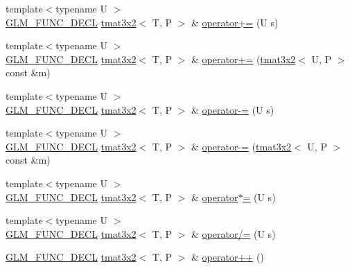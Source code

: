 \begin{DoxyCompactItemize}
\item 
{\footnotesize template$<$typename U $>$ }\\\hyperlink{setup_8hpp_ab2d052de21a70539923e9bcbf6e83a51}{G\+L\+M\+\_\+\+F\+U\+N\+C\+\_\+\+D\+E\+CL} \hyperlink{structglm_1_1detail_1_1tmat3x2}{tmat3x2}$<$ T, P $>$ \& \hyperlink{structglm_1_1detail_1_1tmat3x2_a41d01c7fbc6061206a33b265ddb9649b}{operator+=} (U s)
\item 
{\footnotesize template$<$typename U $>$ }\\\hyperlink{setup_8hpp_ab2d052de21a70539923e9bcbf6e83a51}{G\+L\+M\+\_\+\+F\+U\+N\+C\+\_\+\+D\+E\+CL} \hyperlink{structglm_1_1detail_1_1tmat3x2}{tmat3x2}$<$ T, P $>$ \& \hyperlink{structglm_1_1detail_1_1tmat3x2_a0ce859a11cdafb33342c159b4a4f145a}{operator+=} (\hyperlink{structglm_1_1detail_1_1tmat3x2}{tmat3x2}$<$ U, P $>$ const \&m)
\item 
{\footnotesize template$<$typename U $>$ }\\\hyperlink{setup_8hpp_ab2d052de21a70539923e9bcbf6e83a51}{G\+L\+M\+\_\+\+F\+U\+N\+C\+\_\+\+D\+E\+CL} \hyperlink{structglm_1_1detail_1_1tmat3x2}{tmat3x2}$<$ T, P $>$ \& \hyperlink{structglm_1_1detail_1_1tmat3x2_a5ee8c2917c7b4e74c626af4cf49fce63}{operator-\/=} (U s)
\item 
{\footnotesize template$<$typename U $>$ }\\\hyperlink{setup_8hpp_ab2d052de21a70539923e9bcbf6e83a51}{G\+L\+M\+\_\+\+F\+U\+N\+C\+\_\+\+D\+E\+CL} \hyperlink{structglm_1_1detail_1_1tmat3x2}{tmat3x2}$<$ T, P $>$ \& \hyperlink{structglm_1_1detail_1_1tmat3x2_a8c12556de23e4325c229e14f6c93888c}{operator-\/=} (\hyperlink{structglm_1_1detail_1_1tmat3x2}{tmat3x2}$<$ U, P $>$ const \&m)
\item 
{\footnotesize template$<$typename U $>$ }\\\hyperlink{setup_8hpp_ab2d052de21a70539923e9bcbf6e83a51}{G\+L\+M\+\_\+\+F\+U\+N\+C\+\_\+\+D\+E\+CL} \hyperlink{structglm_1_1detail_1_1tmat3x2}{tmat3x2}$<$ T, P $>$ \& \hyperlink{structglm_1_1detail_1_1tmat3x2_a93560e047aaaafb312d67167380087cb}{operator$\ast$=} (U s)
\item 
{\footnotesize template$<$typename U $>$ }\\\hyperlink{setup_8hpp_ab2d052de21a70539923e9bcbf6e83a51}{G\+L\+M\+\_\+\+F\+U\+N\+C\+\_\+\+D\+E\+CL} \hyperlink{structglm_1_1detail_1_1tmat3x2}{tmat3x2}$<$ T, P $>$ \& \hyperlink{structglm_1_1detail_1_1tmat3x2_a6cee280523aedb0afd6792a2712c55b4}{operator/=} (U s)
\item 
\hyperlink{setup_8hpp_ab2d052de21a70539923e9bcbf6e83a51}{G\+L\+M\+\_\+\+F\+U\+N\+C\+\_\+\+D\+E\+CL} \hyperlink{structglm_1_1detail_1_1tmat3x2}{tmat3x2}$<$ T, P $>$ \& \hyperlink{structglm_1_1detail_1_1tmat3x2_aa739464db6e7ce980fbc84276c6647c1}{operator++} ()

\end{DoxyCompactItemize}
